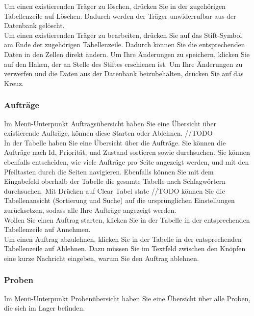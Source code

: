 \documentclass[enabledeprecatedfontcommands,fontsize=12pt,paper=a4,twoside]{scrartcl}
\begin{document}
Um einen existierenden Träger zu löschen, drücken Sie in der zugehörigen Tabellenzeile auf Löschen. Dadurch werden der Träger unwiderrufbar aus der Datenbank gelöscht. \\

Um einen existierenden Träger zu bearbeiten, drücken Sie auf das Stift-Symbol am Ende der zugehörigen Tabellenzeile. Dadurch können Sie die entsprechenden Daten in den Zellen direkt ändern. Um Ihre Änderungen zu speichern, klicken Sie auf den Haken, der an Stelle des Stiftes erschienen ist. Um Ihre Änderungen zu verwerfen und die Daten aus der Datenbank beizubehalten, drücken Sie auf das Kreuz. \\

\subsubsection{Aufträge}
Im Menü-Unterpunkt Auftragsübersicht haben Sie eine Übersicht über existierende Aufträge, können diese Starten oder Ablehnen. //TODO\\

In der Tabelle haben Sie eine Übersicht über die Aufträge. Sie können die Aufträge nach Id, Priorität, und Zustand sortieren sowie durchsuchen. Sie können ebenfalls entscheiden, wie viele Aufträge pro Seite angezeigt werden, und mit den Pfeiltasten durch die Seiten navigieren. Ebenfalls können Sie mit dem Eingabefeld oberhalb der Tabelle die gesamte Tabelle nach Schlagwörtern durchsuchen. Mit Drücken auf Clear Tabel state //TODO können Sie die Tabellenansicht (Sortierung und Suche) auf die ursprünglichen Einstellungen zurücksetzen, sodass alle Ihre Aufträge angezeigt werden. \\

Wollen Sie einen Auftrag starten, klicken Sie in der Tabelle in der entsprechenden Tabellenzeile auf Annehmen. \\

Um einen Auftrag abzulehnen, klicken Sie in der Tabelle in der entsprechenden Tabellenzeile auf Ablehnen. Dazu müssen Sie im Textfeld zwischen den Knöpfen eine kurze Nachricht eingeben, warum Sie den Auftrag ablehnen. \\

\subsubsection{Proben}
Im Menü-Unterpunkt Probenübersicht haben Sie eine Übersicht über alle Proben, die sich im Lager befinden. \\
\end{document}

